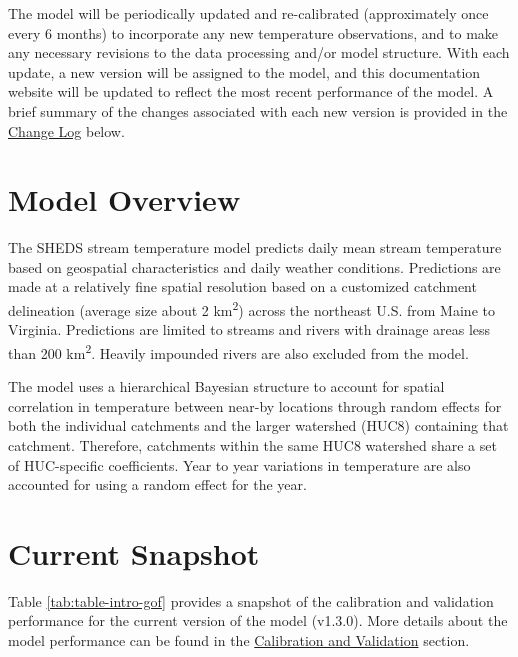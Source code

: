 \documentclass[]{book}
\begin{document}
The model will be periodically updated and re-calibrated (approximately once every 6 months) to incorporate any new temperature observations, and to make any necessary revisions to the data processing and/or model structure. With each update, a new version will be assigned to the model, and this documentation website will be updated to reflect the most recent performance of the model. A brief summary of the changes associated with each new version is provided in the \protect\hyperlink{change-log}{Change Log} below.

\hypertarget{model-overview}{%
\section{Model Overview}\label{model-overview}}

The SHEDS stream temperature model predicts daily mean stream temperature based on geospatial characteristics and daily weather conditions. Predictions are made at a relatively fine spatial resolution based on a customized catchment delineation (average size about 2 km\textsuperscript{2}) across the northeast U.S. from Maine to Virginia. Predictions are limited to streams and rivers with drainage areas less than 200 km\textsuperscript{2}. Heavily impounded rivers are also excluded from the model.

The model uses a hierarchical Bayesian structure to account for spatial correlation in temperature between near-by locations through random effects for both the individual catchments and the larger watershed (HUC8) containing that catchment. Therefore, catchments within the same HUC8 watershed share a set of HUC-specific coefficients. Year to year variations in temperature are also accounted for using a random effect for the year.

\hypertarget{current-snapshot}{%
\section{Current Snapshot}\label{current-snapshot}}

Table \ref{tab:table-intro-gof} provides a snapshot of the calibration and validation performance for the current version of the model (v1.3.0). More details about the model performance can be found in the \protect\hyperlink{calibration-and-validation}{Calibration and Validation} section.
\end{document}
